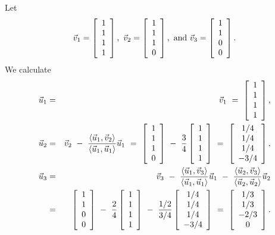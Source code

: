 \documentclass{ximera}
\begin{document}
\begin{solution}
  Let
  \begin{equation*}
    \vect{v}_1 = \startmat{c} 1 \\ 1 \\ 1 \\ 1 \stopmat,\quad
    \vect{v}_2 = \startmat{c} 1 \\ 1 \\ 1 \\ 0 \stopmat,\quad\mbox{and}\quad
    \vect{v}_3 = \startmat{c} 1 \\ 1 \\ 0 \\ 0 \stopmat.
  \end{equation*}
  We calculate
  \begin{eqnarray*}
    \vect{u}_1
    &=& \vect{v}_1
        ~=~ \startmat{c} 1 \\ 1 \\ 1 \\ 1 \stopmat,
    \\
    \vect{u}_2
    &=& \vect{v}_2 ~-~ \frac{\iprod{\vect{u}_1,\vect{v}_2}}{\iprod{\vect{u}_1,\vect{u}_1}}\vect{u}_1
    ~=~ \startmat{c} 1 \\ 1 \\ 1 \\ 0 \stopmat
    ~-~ \frac{3}{4}\startmat{c} 1 \\ 1 \\ 1 \\ 1 \stopmat
    ~=~ \startmat{c} 1/4 \\ 1/4 \\ 1/4 \\ -3/4 \stopmat,
    \\
    \vect{u}_3
    &=& \vect{v}_3
        ~-~ \frac{\iprod{\vect{u}_1,\vect{v}_3}}{\iprod{\vect{u}_1,\vect{u}_1}}\vect{u}_1
        ~-~ \frac{\iprod{\vect{u}_2,\vect{v}_3}}{\iprod{\vect{u}_2,\vect{u}_2}}\vect{u}_2
    \\
    &=& \startmat{c} 1 \\ 1 \\ 0 \\ 0 \stopmat
    ~-~ \frac{2}{4}\startmat{c} 1 \\ 1 \\ 1 \\ 1 \stopmat
    ~-~ \frac{1/2}{3/4}\startmat{c} 1/4 \\ 1/4 \\ 1/4 \\ -3/4 \stopmat
    ~=~ \startmat{c} 1/3 \\ 1/3 \\ -2/3 \\ 0 \stopmat.

\end{eqnarray*}
\end{solution}
\end{document}
